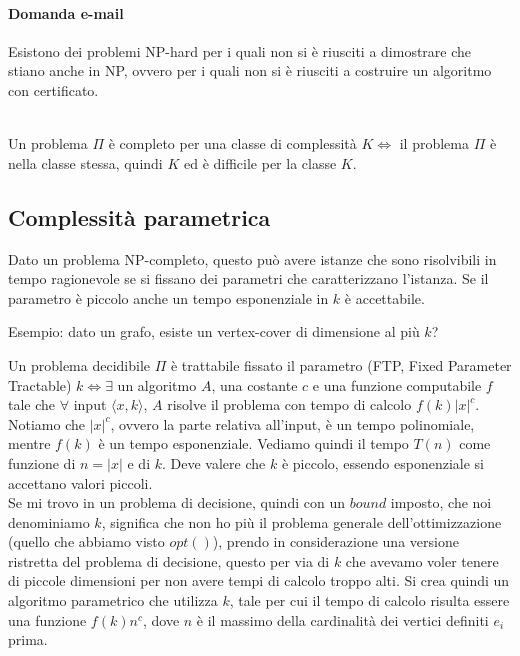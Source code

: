 {
\paragraph{Domanda e-mail}

Esistono dei problemi NP-hard per i quali non si è riusciti a dimostrare che stiano anche in NP, ovvero per i quali non si è riusciti a costruire un algoritmo con certificato.
}\\

Un problema $\Pi$ è completo per una classe di complessità $K \iff$ il problema $\Pi$ è nella classe stessa, quindi $K$ ed è difficile per la classe $K$.  
\subsection{Complessità parametrica}
Dato un problema NP-completo, questo può avere istanze che sono risolvibili in tempo ragionevole se si fissano dei parametri che caratterizzano l’istanza. Se il parametro è piccolo anche un tempo esponenziale in $k$ è accettabile.

Esempio: dato un grafo, esiste un vertex-cover di dimensione al più $k$?

Un problema decidibile $\Pi$ è trattabile fissato il parametro (FTP, Fixed Parameter Tractable) $k \iff \exists$ un algoritmo $A$, una costante $c$ e una funzione computabile $f$ tale che $\forall$ input $\langle x, k \rangle$, $A$ risolve il problema con tempo di calcolo $f(k)|x|^c$. \\

Notiamo che $|x|^c$, ovvero la parte relativa all'input, è un tempo polinomiale, mentre $f(k)$ è un tempo esponenziale.
Vediamo quindi il tempo $T(n)$ come funzione di $n =|x|$ e di $k$. Deve valere che $k$ è piccolo, essendo esponenziale si accettano valori piccoli. \\

Se mi trovo in un problema di decisione, quindi con un $bound$ imposto, che noi denominiamo $k$, significa che non ho più il problema generale dell'ottimizzazione (quello che abbiamo visto $opt()$), prendo in considerazione una versione ristretta del problema di decisione, questo per via di $k$ che avevamo voler tenere di piccole dimensioni per non avere tempi di calcolo troppo alti. Si crea quindi un algoritmo parametrico che utilizza $k$, tale per cui il tempo di calcolo risulta essere una funzione  $f(k)n^c$, dove $n$ è il massimo della cardinalità dei vertici definiti $e_i$ prima. \\


